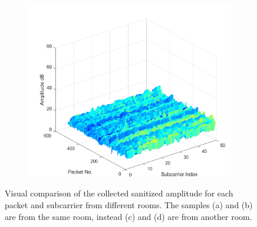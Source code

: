 \documentclass[binding=0.6cm,noexaminfo]{sapthesis}
\begin{document}
\begin{figure}[h!]
\begin{subfigure}{.49\textwidth}
	\caption{}
\end{subfigure}
\begin{subfigure}{.49\textwidth}
	\centering
	\includegraphics[width=.8\linewidth]{room2-v7-10}
	\caption{}
\end{subfigure}
\caption{Visual comparison of the collected sanitized amplitude for each packet and subcarrier from different rooms. The samples (a) and (b) are from the same room, instead (c) and (d) are from another room.}
\label{fig:amp-comp}
\end{figure}
\end{document}
